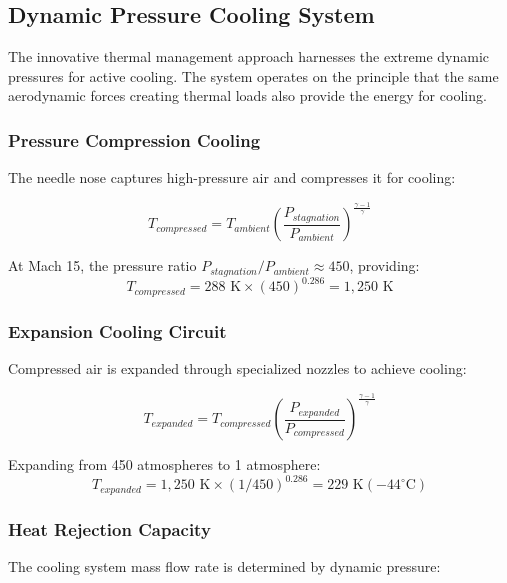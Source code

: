 \documentclass[12pt,a4paper]{article}
\begin{document}
\subsection{Dynamic Pressure Cooling System}

The innovative thermal management approach harnesses the extreme dynamic pressures for active cooling. The system operates on the principle that the same aerodynamic forces creating thermal loads also provide the energy for cooling.

\subsubsection{Pressure Compression Cooling}
The needle nose captures high-pressure air and compresses it for cooling:

\begin{equation}
T_{compressed} = T_{ambient} \left(\frac{P_{stagnation}}{P_{ambient}}\right)^{\frac{\gamma-1}{\gamma}}
\label{eq:compression_temperature}
\end{equation}

At Mach 15, the pressure ratio $P_{stagnation}/P_{ambient} \approx 450$, providing:
\begin{equation}
T_{compressed} = 288 \text{ K} \times (450)^{0.286} = 1,250 \text{ K}
\label{eq:compressed_temp_calc}
\end{equation}

\subsubsection{Expansion Cooling Circuit}
Compressed air is expanded through specialized nozzles to achieve cooling:

\begin{equation}
T_{expanded} = T_{compressed} \left(\frac{P_{expanded}}{P_{compressed}}\right)^{\frac{\gamma-1}{\gamma}}
\label{eq:expansion_temperature}
\end{equation}

Expanding from 450 atmospheres to 1 atmosphere:
\begin{equation}
T_{expanded} = 1,250 \text{ K} \times (1/450)^{0.286} = 229 \text{ K} (-44^\circ\text{C})
\label{eq:expanded_temp_calc}
\end{equation}

\subsubsection{Heat Rejection Capacity}
The cooling system mass flow rate is determined by dynamic pressure:
\end{document}
